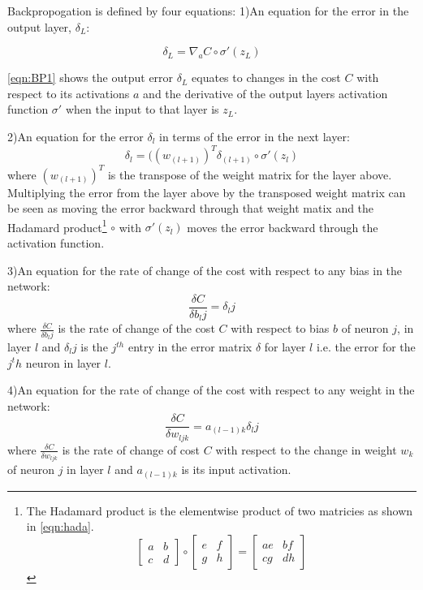 Backpropogation is defined by four equations:
1)An equation for the error in the output layer, $\delta_L$:

\begin{equation}
\delta_L = \nabla_a C \circ \sigma'(z_L)
\label{eqn:BP1}
\end{equation}

\autoref{eqn:BP1} shows the output error $\delta_L$ equates to changes in the cost $C$ with respect to its activations $a$ and the derivative of the output layers activation function $\sigma'$ when the input to that layer is $z_L$.

2)An equation for the error $\delta_l$ in terms of the error in the next layer:
\begin{equation}
\delta_l = ((w_{(l+1)})^T\delta_{(l+1)} \circ \sigma'(z_l)
\label{eqn:BP2}
\end{equation}
where $(w_{(l+1)})^T$ is the transpose of the weight matrix for the layer above. Multiplying the error from the layer above by the transposed weight matrix can be seen as moving the error backward through that weight matix and the Hadamard product\footnote{The Hadamard product is the elementwise product of two matricies as shown in \autoref{eqn:hada}. \begin{equation}
\begin{bmatrix}
a & b \\
c & d
\end{bmatrix} \circ \begin{bmatrix}
e & f \\
g & h
\end{bmatrix} = \begin{bmatrix}
ae & bf \\
cg & dh
\end{bmatrix}
\label{eqn:hada}
\end{equation}} $\circ$ with $\sigma'(z_l)$ moves the error backward through the activation function.

3)An equation for the rate of change of the cost with respect to any bias in the network:
\begin{equation}
\frac{\delta C}{\delta b_lj} = \delta_lj
\label{eqn:BP3}
\end{equation}
where $\frac{\delta C}{\delta b_lj}$ is the rate of change of the cost $C$ with respect to bias $b$ of neuron $j$, in layer $l$ and $\delta_lj$ is the $j^{th}$ entry in the error matrix $\delta$ for layer $l$ i.e. the error for the $j^th$ neuron in layer $l$.

4)An equation for the rate of change of the cost with respect to any weight in the network:
\begin{equation}
\frac{\delta C}{\delta w_{ljk}} = a_{(l-1)k}\delta_lj
\label{eqn:BP4}
\end{equation}
where $\frac{\delta C}{\delta w_{ljk}}$ is the rate of change of cost $C$ with respect to the change in weight $w_k$ of neuron $j$ in layer $l$ and $a_{(l-1)k}$ is its input activation.

